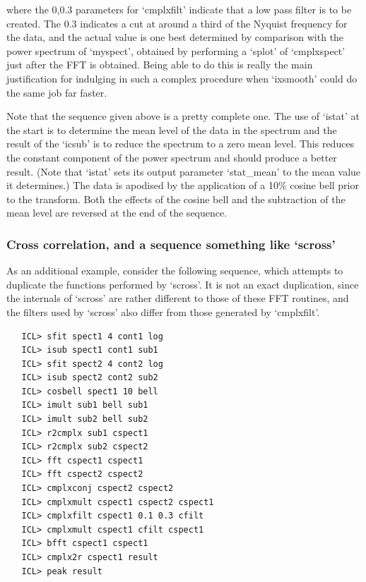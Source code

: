 \documentclass[11pt,twoside]{article}
\begin{document}
   where the 0,0.3 parameters for `cmplxfilt' indicate that a low pass
   filter is to be created.  The 0.3 indicates a cut at around a third
   of the Nyquist frequency for the data, and the actual value is one
   best determined by comparison with the power spectrum of `myspect',
   obtained by performing a `splot' of `cmplxspect' just after the FFT
   is obtained.  Being able to do this is really the main justification
   for indulging in such a complex procedure when `ixsmooth' could do
   the same job far faster.

   Note that the sequence given above is a pretty complete one.  The use
   of `istat' at the start is to determine the mean level of the data in
   the spectrum and the result of the `icsub' is to reduce the spectrum
   to a zero mean level.  This reduces the constant component of the
   power spectrum and should produce a better result.  (Note that
   `istat' sets its output parameter `stat\_mean' to the mean value it
   determines.)  The data is apodised by the application of a 10\% cosine
   bell prior to the transform.  Both the effects of the cosine bell and
   the subtraction of the mean level are reversed at the end of the
   sequence.


\subsubsection{\label{techno6cross}Cross correlation, and a sequence something like `scross'}

   As an additional example, consider the following sequence, which
   attempts to duplicate the functions performed by `scross'. It is not
   an exact duplication, since the internals of `scross' are rather
   different to those of these FFT routines, and the filters used by
   `scross' also differ from those generated by `cmplxfilt'.

\begin{verbatim}
   ICL> sfit spect1 4 cont1 log
   ICL> isub spect1 cont1 sub1
   ICL> sfit spect2 4 cont2 log
   ICL> isub spect2 cont2 sub2
   ICL> cosbell spect1 10 bell
   ICL> imult sub1 bell sub1
   ICL> imult sub2 bell sub2
   ICL> r2cmplx sub1 cspect1
   ICL> r2cmplx sub2 cspect2
   ICL> fft cspect1 cspect1
   ICL> fft cspect2 cspect2
   ICL> cmplxconj cspect2 cspect2
   ICL> cmplxmult cspect1 cspect2 cspect1
   ICL> cmplxfilt cspect1 0.1 0.3 cfilt
   ICL> cmplxmult cspect1 cfilt cspect1
   ICL> bfft cspect1 cspect1
   ICL> cmplx2r cspect1 result
   ICL> peak result
\end{verbatim}
\end{document}
